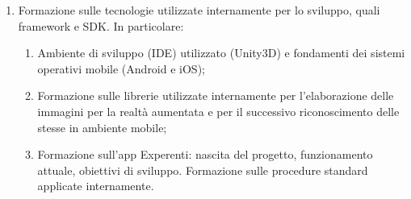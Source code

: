 \begin{enumerate}
	\item	Formazione sulle tecnologie utilizzate internamente per lo sviluppo, quali framework e SDK. In particolare:
	
	\begin{enumerate}	
		\item	Ambiente di sviluppo (IDE) utilizzato (Unity3D) e fondamenti dei sistemi operativi mobile (Android e iOS); 
		\item	Formazione sulle librerie utilizzate internamente per l’elaborazione delle immagini per la realtà aumentata e per il successivo riconoscimento delle stesse in ambiente mobile; 
		\item	Formazione sull’app Experenti: nascita del progetto, funzionamento attuale, obiettivi di sviluppo. Formazione sulle procedure standard applicate internamente.	
	\end{enumerate}
	

\end{enumerate}
